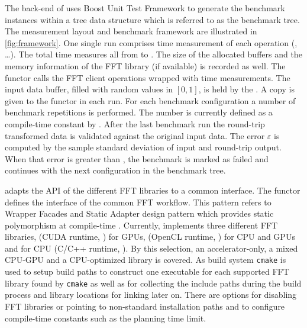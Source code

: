 The back-end of \gearshifft{} uses Boost Unit Test Framework to generate the benchmark instances within a tree data structure which is referred to as the benchmark tree.
The measurement layout and benchmark framework are illustrated in \cref{fig:framework}. One single run comprises time measurement of each operation (, \ldots). The total time measures all from  to . The size of the allocated buffers and the memory information of the FFT library (if available) is recorded as well. The functor  calls the FFT client operations wrapped with time measurements. The input data buffer, filled with random values in $[0,1]$, is held by the . A copy is given to the  functor in each run. For each benchmark configuration a number of benchmark repetitions is performed. The number is currently defined as a compile-time constant by . After the last benchmark run the round-trip transformed data is validated against the original input data. The error $\varepsilon$ is computed by the sample standard deviation of input and round-trip output. When that error is greater than , the benchmark is marked as failed and \gearshifft{} continues with the next configuration in the benchmark tree.


\gearshifft{} adapts the API of the different FFT libraries to a common interface. The  functor defines the interface of the common FFT workflow. This pattern refers to Wrapper Facades and Static Adapter design pattern which provides static polymorphism at compile-time \cite{bachmann}.
Currently, \gearshifft{} implements three different FFT libraries, \cufft{} (CUDA runtime, \cite{nvidia2010cufft}) for \nvidia{} GPUs, \clfft{} (OpenCL runtime, \cite{clfft}) for CPU and GPUs and \fftw{} for CPU (C/C++ runtime, \cite{FFTW05}). By this selection, an accelerator-only, a mixed CPU-GPU and a CPU-optimized library is covered.
%
As build system \texttt{cmake} is used to setup build paths to construct one executable for each supported FFT library found by \texttt{cmake} as well as for collecting the include paths during the build process and library locations for linking later on. There are options for disabling FFT libraries or pointing to non-standard installation paths and to configure compile-time constants such as the \fftw{} planning time limit. 


